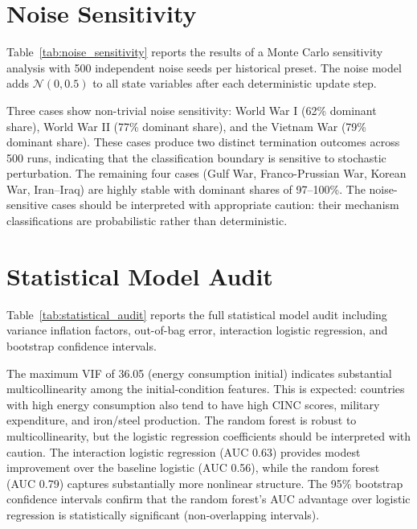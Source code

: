 \section{Noise Sensitivity}
\label{app:noise_sensitivity}

Table~\ref{tab:noise_sensitivity} reports the results of a Monte Carlo sensitivity analysis with 500 independent noise seeds per historical preset. The noise model adds $\mathcal{N}(0, 0.5)$ to all state variables after each deterministic update step.



Three cases show non-trivial noise sensitivity: World War I (62\% dominant share), World War II (77\% dominant share), and the Vietnam War (79\% dominant share). These cases produce two distinct termination outcomes across 500 runs, indicating that the classification boundary is sensitive to stochastic perturbation. The remaining four cases (Gulf War, Franco-Prussian War, Korean War, Iran--Iraq) are highly stable with dominant shares of 97--100\%. The noise-sensitive cases should be interpreted with appropriate caution: their mechanism classifications are probabilistic rather than deterministic.

\section{Statistical Model Audit}
\label{app:statistical_audit}

Table~\ref{tab:statistical_audit} reports the full statistical model audit including variance inflation factors, out-of-bag error, interaction logistic regression, and bootstrap confidence intervals.



The maximum VIF of 36.05 (energy consumption initial) indicates substantial multicollinearity among the initial-condition features. This is expected: countries with high energy consumption also tend to have high CINC scores, military expenditure, and iron/steel production. The random forest is robust to multicollinearity, but the logistic regression coefficients should be interpreted with caution. The interaction logistic regression (AUC 0.63) provides modest improvement over the baseline logistic (AUC 0.56), while the random forest (AUC 0.79) captures substantially more nonlinear structure. The 95\% bootstrap confidence intervals confirm that the random forest's AUC advantage over logistic regression is statistically significant (non-overlapping intervals).

